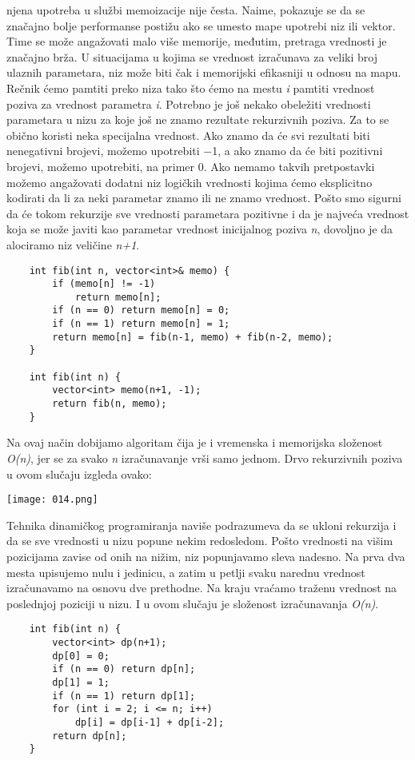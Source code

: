 \documentclass{article}
\begin{document}
njena upotreba u službi memoizacije nije česta. Naime, pokazuje se da se značajno
bolje performanse postižu ako se umesto mape upotrebi niz ili vektor. Time se
može angažovati malo više memorije, međutim, pretraga vrednosti je značajno
brža. U situacijama u kojima se vrednost izračunava za veliki broj ulaznih
parametara, niz može
biti čak i memorijski efikasniji u odnosu na mapu.
\newline
Rečnik ćemo pamtiti preko niza tako što ćemo na mestu \textit{i} pamtiti vrednost poziva
za vrednost parametra \textit{i}. Potrebno je još nekako obeležiti vrednosti parametara
u nizu za koje još ne znamo rezultate rekurzivnih poziva. Za to se obično koristi
neka specijalna vrednost. Ako znamo da će svi rezultati biti nenegativni brojevi,
možemo upotrebiti −1, a ako znamo da će biti pozitivni brojevi,
možemo upotrebiti, na primer 0. Ako nemamo takvih pretpostavki možemo
angažovati dodatni niz logičkih vrednosti kojima ćemo eksplicitno kodirati da
li za neki parametar znamo ili ne znamo vrednost. Pošto smo sigurni da će
tokom rekurzije sve vrednosti parametara pozitivne i da je najveća vrednost
koja se može javiti kao parametar vrednost inicijalnog poziva \textit{n}, dovoljno je da
alociramo niz veličine \textit{n+1}.
\begin{lstlisting}
    int fib(int n, vector<int>& memo) {
        if (memo[n] != -1)
            return memo[n];
        if (n == 0) return memo[n] = 0;
        if (n == 1) return memo[n] = 1;
        return memo[n] = fib(n-1, memo) + fib(n-2, memo);
    }

    int fib(int n) {
        vector<int> memo(n+1, -1);
        return fib(n, memo);
    }
\end{lstlisting}
Na ovaj način dobijamo algoritam čija je i vremenska i memorijska složenost
\textit{O(n)}, jer se za svako \textit{n} izračunavanje vrši samo jednom. Drvo rekurzivnih poziva
u ovom slučaju izgleda ovako:
\begin{center}
    \texttt{[image: 014.png]}
\end{center}
Tehnika dinamičkog programiranja naviše podrazumeva da se ukloni rekurzija i
da se sve vrednosti u nizu popune nekim redosledom. Pošto vrednosti na višim
pozicijama zavise od onih na nižim, niz popunjavamo sleva nadesno. Na prva
dva mesta upisujemo nulu i jedinicu, a zatim u petlji svaku narednu vrednost
izračunavamo na osnovu dve prethodne. Na kraju vraćamo traženu vrednost na
poslednjoj poziciji u nizu. I u ovom slučaju je složenost izračunavanja \textit{O(n)}.
\begin{lstlisting}
    int fib(int n) {
        vector<int> dp(n+1);
        dp[0] = 0;
        if (n == 0) return dp[n];
        dp[1] = 1;
        if (n == 1) return dp[1];
        for (int i = 2; i <= n; i++)
            dp[i] = dp[i-1] + dp[i-2];
        return dp[n];
    }
\end{lstlisting}
\end{document}
